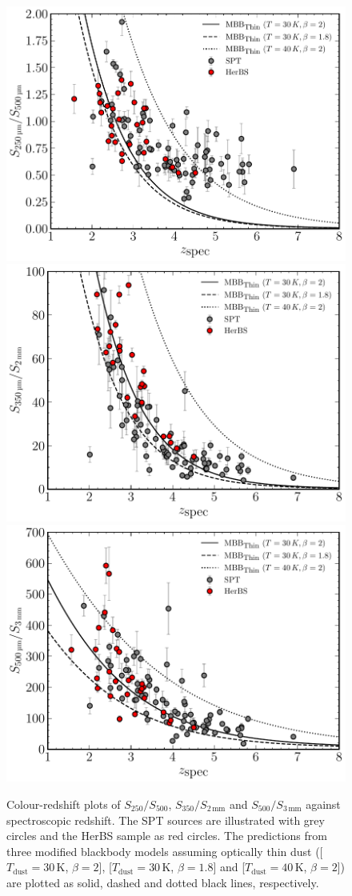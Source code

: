 \begin{figure}
    \centering
    \includegraphics[width=0.55\columnwidth,height=0.29\textheight]{Figures/spt_herbs_colour_250_500.pdf}
    \includegraphics[width=0.55\columnwidth,height=0.29\textheight]{Figures/spt_herbs_colour_350_2000.pdf}
    \includegraphics[width=0.55\columnwidth,height=0.29\textheight]{Figures/spt_herbs_colour_500_3000.pdf}
    \caption[Colours of HerBS and SPT sources as a function of redshift]{Colour-redshift plots of $S_{250}/S_{500}$, $S_{350}/S_{2\,\textrm{mm}}$ and $S_{500}/S_{3\,\textrm{mm}}$ against spectroscopic redshift. The SPT sources are illustrated with grey circles and the HerBS sample as red circles. The predictions from three modified blackbody models assuming optically thin dust ([$T_{\textrm{dust}} = 30\,$K, $\beta = 2$], [$T_{\textrm{dust}} = 30\,$K, $\beta = 1.8$] and [$T_{\textrm{dust}} = 40\,$K, $\beta = 2$]) are plotted as solid, dashed and dotted black lines, respectively.}
    \label{fig:spt_herbs_colour_redshift}
\end{figure}

